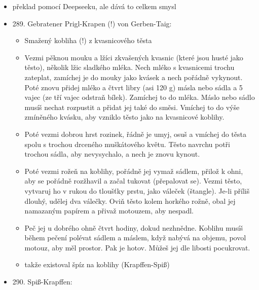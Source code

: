 \begin{itemize}
\begin{itemize}
    \begin{itemize}
    \tightlist
    \item
      překlad pomocí Deepseeku, ale dává to celkem smysl
    \item
      289. Gebratener Prigl-Krapen (!) von Gerben-Taig:

      \begin{itemize}
      \tightlist
      \item
        Smažený kobliha (!) z kvasnicového těsta
      \item
        Vezmi pěknou mouku a lžíci zkvašených kvasnic (které jsou husté
        jako těsto), několik lžic sladkého mléka. Nech mléko s
        kvasnicemi trochu zateplat, zamíchej je do mouky jako kvásek a
        nech pořádně vykynout. Poté znovu přidej mléko a čtvrt libry
        (asi 120 g) másla nebo sádla a 5 vajec (ze tří vajec odstraň
        bílek). Zamíchej to do mléka. Máslo nebo sádlo musíš nechat
        rozpustit a přidat jej také do směsi. Vmíchej to do výše
        zmíněného kvásku, aby vzniklo těsto jako na kvasnicové koblihy.
      \item
        Poté vezmi dobrou hrst rozinek, řádně je umyj, osuš a vmíchej do
        těsta spolu s trochou drceného muškátového květu. Těsto navrchu
        potři trochou sádla, aby nevysychalo, a nech je znovu kynout.
      \item
        Poté vezmi rožeň na koblihy, pořádně jej vymaž sádlem, přilož k
        ohni, aby se pořádně rozžhavil a začal tukovat (přepalovat se).
        Vezmi těsto, vytvaruj ho v rukou do tloušťky prstu, jako váleček
        (štangle). Je-li příliš dlouhý, udělej dva válečky. Oviň těsto
        kolem horkého rožně, obal jej namazaným papírem a přivaž
        motouzem, aby nespadl.
      \item
        Peč jej u dobrého ohně čtvrt hodiny, dokud nezhnědne. Koblihu
        musíš během pečení polévat sádlem a máslem, když nabývá na
        objemu, povol motouz, aby měl prostor. Pak je hotov. Můžeš jej
        dle libosti pocukrovat.
      \item
        takže existoval špíz na koblihy (Krapffen-Spiß)
      \end{itemize}
    \item
      290. Spiß-Krapffen:


\end{itemize}
\end{itemize}
\end{itemize}
